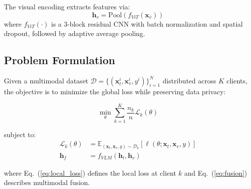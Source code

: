 \documentclass[10pt,journal,compsoc]{IEEEtran}
\begin{document}
\begin{table}[htbp]
\centering
\caption{ViT Encoder Variants}
\label{tab:vit_variants}
\small
{}
\end{table}

The visual encoding extracts features via:
\begin{equation}
    \mathbf{h}_v = \text{Pool}(f_{ViT}(\mathbf{x}_v))
    \label{eq:image_encoding}
\end{equation}
where $f_{ViT}(\cdot)$ is a 3-block residual CNN with batch normalization and spatial dropout, followed by adaptive average pooling.

\subsection{Problem Formulation}

Given a multimodal dataset $\mathcal{D} = \{(\mathbf{x}_t^i, \mathbf{x}_v^i, y^i)\}_{i=1}^N$ distributed across $K$ clients, the objective is to minimize the global loss while preserving data privacy:

\begin{equation}
    \min_\theta \sum_{k=1}^{K} \frac{n_k}{n} \mathcal{L}_k(\theta)
    \label{eq:federated_objective}
\end{equation}

subject to:
\begin{align}
    \mathcal{L}_k(\theta) &= \mathbb{E}_{(\mathbf{x}_t, \mathbf{x}_v, y) \sim \mathcal{D}_k}[\ell(\theta; \mathbf{x}_t, \mathbf{x}_v, y)] \label{eq:local_loss}\\
    \mathbf{h}_f &= f_{VLM}(\mathbf{h}_t, \mathbf{h}_v) \label{eq:fusion}
\end{align}

where Eq.~(\ref{eq:local_loss}) defines the local loss at client $k$ and Eq.~(\ref{eq:fusion}) describes multimodal fusion.
\end{document}

